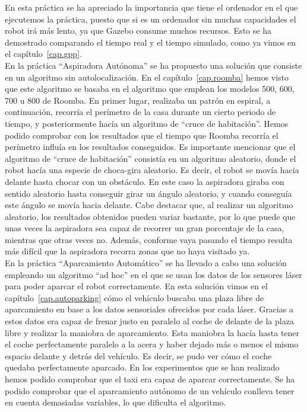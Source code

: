 En esta práctica se ha apreciado la importancia que tiene el ordenador en el que ejecutemos la práctica, puesto que si es un ordenador sin muchas capacidades el robot irá más lento, ya que Gazebo consume muchos recursos. Esto se ha demostrado comparando el tiempo real y el tiempo simulado, como ya vimos en el capítulo~\ref{cap.gpp}.\\

En la práctica ``Aspiradora Autónoma'' se ha propuesto una solución que consiste en un algoritmo sin autolocalización. En el capítulo~\ref{cap.roomba} hemos visto que este algoritmo se basaba en el algoritmo que emplean los modelos 500, 600, 700 u 800 de Roomba. En primer lugar, realizaba un patrón en espiral, a continuación, recorría el perímetro de la casa durante un cierto periodo de tiempo, y posteriormente hacía un algoritmo de ``cruce de habitación''. Hemos podido comprobar con los resultados que el tiempo que Roomba recorría el perímetro influía en los resultados conseguidos. Es importante mencionar que el algoritmo de ``cruce de habitación'' consistía en un algoritmo aleatorio, donde el robot hacía una especie de choca-gira aleatorio. Es decir, el robot se movía hacia delante hasta chocar con un obstáculo. En este caso la aspiradora giraba con sentido aleatorio hasta conseguir girar un ángulo aleatorio, y cuando conseguía este ángulo se movía hacia delante. Cabe destacar que, al realizar un algoritmo aleatorio, los resultados obtenidos pueden variar bastante, por lo que puede que unas veces la aspiradora sea capaz de recorrer un gran porcentaje de la casa, mientras que otras veces no. Además, conforme vaya pasando el tiempo resulta más difícil que la aspiradora recorra zonas que no haya visitado ya.\\

En la práctica ``Aparcamiento Automático'' se ha llevado a cabo una solución empleando un algoritmo ``ad hoc'' en el que se usan los datos de los sensores láser para poder aparcar el robot correctamente. En esta solución vimos en el capítulo~\ref{cap.autoparking} cómo el vehículo buscaba una plaza libre de aparcamiento en base a los datos sensoriales ofrecidos por cada láser. Gracias a estos datos era capaz de frenar justo en paralelo al coche de delante de la plaza libre y realizar la maniobra de aparcamiento. Esta maniobra la hacía hasta tener el coche perfectamente paralelo a la acera y haber dejado más o menos el mismo espacio delante y detrás del vehículo. Es decir, se pudo ver cómo el coche quedaba perfectamente aparcado. En los experimentos que se han realizado hemos podido comprobar que el taxi era capaz de aparcar correctamente. Se ha podido comprobar que el aparcamiento autónomo de un vehículo conlleva tener en cuenta demasiadas variables, lo que dificulta el algoritmo.\\


